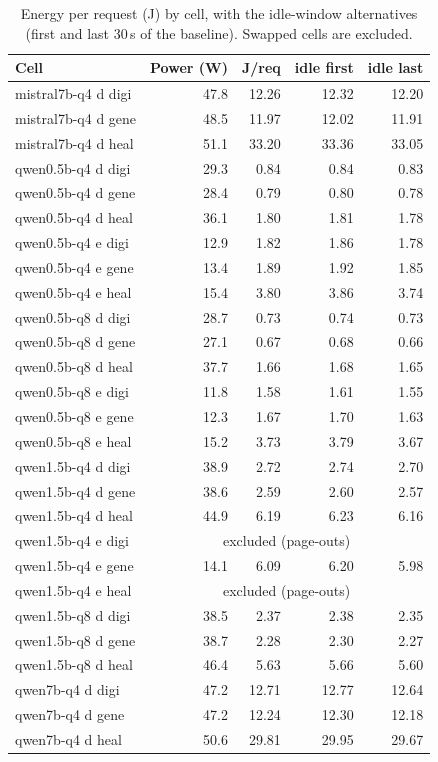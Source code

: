 \begin{table}[h]\centering\footnotesize
\caption{Energy per request (J) by cell, with the idle-window alternatives (first and last 30\,s of the baseline). Swapped cells are excluded.}\label{tab:cells}
\begin{tabular}{@{}lrrrr@{}}\toprule
Cell & Power (W) & J/req & idle first & idle last\\\midrule
mistral7b-q4 d digi & 47.8 & 12.26 & 12.32 & 12.20\\
mistral7b-q4 d gene & 48.5 & 11.97 & 12.02 & 11.91\\
mistral7b-q4 d heal & 51.1 & 33.20 & 33.36 & 33.05\\
qwen0.5b-q4 d digi & 29.3 & 0.84 & 0.84 & 0.83\\
qwen0.5b-q4 d gene & 28.4 & 0.79 & 0.80 & 0.78\\
qwen0.5b-q4 d heal & 36.1 & 1.80 & 1.81 & 1.78\\
qwen0.5b-q4 e digi & 12.9 & 1.82 & 1.86 & 1.78\\
qwen0.5b-q4 e gene & 13.4 & 1.89 & 1.92 & 1.85\\
qwen0.5b-q4 e heal & 15.4 & 3.80 & 3.86 & 3.74\\
qwen0.5b-q8 d digi & 28.7 & 0.73 & 0.74 & 0.73\\
qwen0.5b-q8 d gene & 27.1 & 0.67 & 0.68 & 0.66\\
qwen0.5b-q8 d heal & 37.7 & 1.66 & 1.68 & 1.65\\
qwen0.5b-q8 e digi & 11.8 & 1.58 & 1.61 & 1.55\\
qwen0.5b-q8 e gene & 12.3 & 1.67 & 1.70 & 1.63\\
qwen0.5b-q8 e heal & 15.2 & 3.73 & 3.79 & 3.67\\
qwen1.5b-q4 d digi & 38.9 & 2.72 & 2.74 & 2.70\\
qwen1.5b-q4 d gene & 38.6 & 2.59 & 2.60 & 2.57\\
qwen1.5b-q4 d heal & 44.9 & 6.19 & 6.23 & 6.16\\
qwen1.5b-q4 e digi & \multicolumn{4}{c}{excluded (page-outs)}\\
qwen1.5b-q4 e gene & 14.1 & 6.09 & 6.20 & 5.98\\
qwen1.5b-q4 e heal & \multicolumn{4}{c}{excluded (page-outs)}\\
qwen1.5b-q8 d digi & 38.5 & 2.37 & 2.38 & 2.35\\
qwen1.5b-q8 d gene & 38.7 & 2.28 & 2.30 & 2.27\\
qwen1.5b-q8 d heal & 46.4 & 5.63 & 5.66 & 5.60\\
qwen7b-q4 d digi & 47.2 & 12.71 & 12.77 & 12.64\\
qwen7b-q4 d gene & 47.2 & 12.24 & 12.30 & 12.18\\
qwen7b-q4 d heal & 50.6 & 29.81 & 29.95 & 29.67\\
\bottomrule\end{tabular}\end{table}
